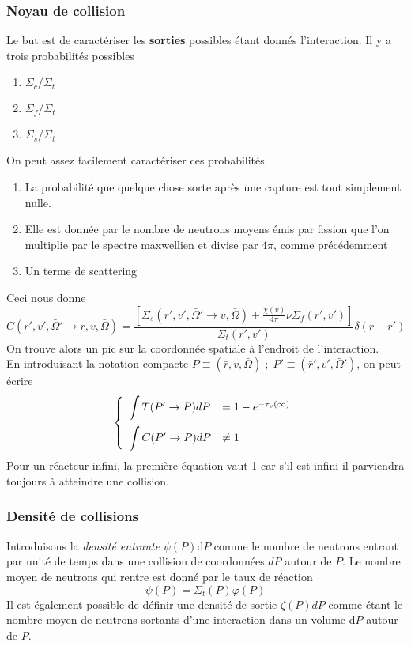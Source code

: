 \subsubsection{Noyau de collision}
Le but est de caractériser les \textbf{sorties} possibles étant donnés l'interaction. Il y a trois 
probabilités possibles
\begin{enumerate}
\item $\Sigma_c/\Sigma_t$
\item $\Sigma_f/\Sigma_t$
\item $\Sigma_s/\Sigma_t$
\end{enumerate}
On peut assez facilement caractériser ces probabilités
\begin{enumerate}
\item La probabilité que quelque chose sorte après une capture est tout simplement nulle.
\item Elle est donnée par le nombre de neutrons moyens émis par fission que l'on multiplie par le
spectre maxwellien et divise par $4\pi$, comme précédemment
\item Un terme de scattering
\end{enumerate}
Ceci nous donne
\begin{equation}
C(\bar r',v',\bar \Omega ' \to \bar r,v,\bar \Omega ) = \frac{{[{\Sigma _s}(\bar r',v',\bar \Omega ' \to v,\bar \Omega ) + \frac{{\chi (v)}}{{4\pi }}\nu {\Sigma _f}(\bar r',v')]}}{{{\Sigma _t}(\bar r',v')}}\delta (\bar r - \bar r')
\end{equation}
On trouve alors un pic sur la coordonnée spatiale à l'endroit de l'interaction.\\

En introduisant la notation compacte $P \equiv (\bar r,v,\bar \Omega )\;;\;P' \equiv (\bar r',v',
\bar \Omega ')$, on peut écrire
\begin{equation}
\left\{\begin{array}{ll}
\DS \int T(P'\to P)dP &= 1-e^{-\tau_v(\infty)}\vspace{2mm}\\
\DS \int C(P'\to P)dP &\neq 1
\end{array}\right.
\end{equation}
Pour un réacteur infini, la première équation vaut 1 car s'il est infini il parviendra toujours à 
atteindre une collision.  

\subsubsection{Densité de collisions}
Introduisons la \textit{densité entrante} $\psi(P)$d$P$ comme le nombre de neutrons entrant par 
unité de temps dans une collision de coordonnées $dP$ autour de $P$. Le nombre moyen de neutrons 
qui rentre est donné par le taux de réaction
\begin{equation}
\psi (P) = {\Sigma _t}(P)\varphi (P)
\end{equation}
Il est également possible de définir une densité de sortie $\zeta (P)dP$ comme étant le nombre moyen de neutrons sortants d'une interaction dans un volume d$P$ autour de $P$. \\

